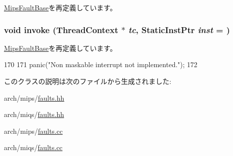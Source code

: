 \hyperlink{classMipsISA_1_1MipsFaultBase_a2bd783b42262278d41157d428e1f8d6f}{MipsFaultBase}を再定義しています。\hypertarget{classMipsISA_1_1NonMaskableInterrupt_a2bd783b42262278d41157d428e1f8d6f}{
\subsubsection[{invoke}]{\setlength{\rightskip}{0pt plus 5cm}void invoke ({\bf ThreadContext} $\ast$ {\em tc}, \/  {\bf StaticInstPtr} {\em inst} = {})}}
\label{classMipsISA_1_1NonMaskableInterrupt_a2bd783b42262278d41157d428e1f8d6f}


\hyperlink{classMipsISA_1_1MipsFaultBase_a2bd783b42262278d41157d428e1f8d6f}{MipsFaultBase}を再定義しています。


\begin{DoxyCode}
170 {
171     panic("Non maskable interrupt not implemented.\n");
172 }
\end{DoxyCode}


このクラスの説明は次のファイルから生成されました:\begin{DoxyCompactItemize}
\item 
arch/mips/\hyperlink{arch_2mips_2faults_8hh}{faults.hh}\item 
arch/miqs/\hyperlink{arch_2miqs_2faults_8hh}{faults.hh}\item 
arch/mips/\hyperlink{arch_2mips_2faults_8cc}{faults.cc}\item 
arch/miqs/\hyperlink{arch_2miqs_2faults_8cc}{faults.cc}\end{DoxyCompactItemize}
